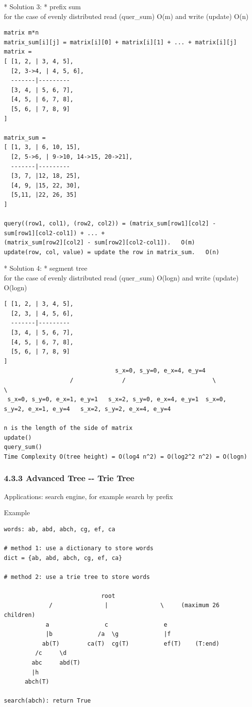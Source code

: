 \documentclass[11pt]{article}
\begin{document}
 * Solution 3: * prefix sum\\
for the case of evenly distributed read (quer\_sum) O(m) and write
(update) O(n)

\begin{verbatim}
matrix m*n
matrix_sum[i][j] = matrix[i][0] + matrix[i][1] + ... + matrix[i][j]
matrix = 
[ [1, 2, | 3, 4, 5],
  [2, 3->4, | 4, 5, 6],
  -------|---------
  [3, 4, | 5, 6, 7],
  [4, 5, | 6, 7, 8],
  [5, 6, | 7, 8, 9]
]

matrix_sum = 
[ [1, 3, | 6, 10, 15],
  [2, 5->6, | 9->10, 14->15, 20->21],
  -------|---------
  [3, 7, |12, 18, 25],
  [4, 9, |15, 22, 30],
  [5,11, |22, 26, 35]
]

query((row1, col1), (row2, col2)) = (matrix_sum[row1][col2] - sum[row1][col2-col1]) + ... +
(matrix_sum[row2][col2] - sum[row2][col2-col1]).   O(m)
update(row, col, value) = update the row in matrix_sum.   O(n)
\end{verbatim}

 * Solution 4: * segment tree\\
for the case of evenly distributed read (quer\_sum) O(logn) and write
(update) O(logn)

\begin{verbatim}
[ [1, 2, | 3, 4, 5],
  [2, 3, | 4, 5, 6],
  -------|---------
  [3, 4, | 5, 6, 7],
  [4, 5, | 6, 7, 8],
  [5, 6, | 7, 8, 9]
]
                                s_x=0, s_y=0, e_x=4, e_y=4
                   /              /                         \                          \
 s_x=0, s_y=0, e_x=1, e_y=1   s_x=2, s_y=0, e_x=4, e_y=1  s_x=0, s_y=2, e_x=1, e_y=4   s_x=2, s_y=2, e_x=4, e_y=4 
 
n is the length of the side of matrix
update()
query_sum()
Time Complexity O(tree height) = O(log4 n^2) = O(log2^2 n^2) = O(logn)
\end{verbatim}

    \subsubsection{4.3.3 Advanced Tree -\/- Trie
Tree}\label{advanced-tree----trie-tree}

Applications: search engine, for example search by prefix

Example

\begin{verbatim}
words: ab, abd, abch, cg, ef, ca

# method 1: use a dictionary to store words
dict = {ab, abd, abch, cg, ef, ca}

# method 2: use a trie tree to store words

                            root
             /               |               \     (maximum 26 children)
            a                c                e
            |b             /a  \g             |f  
           ab(T)        ca(T)  cg(T)          ef(T)    (T:end)
         /c     \d
        abc     abd(T)
        |h
      abch(T)

search(abch): return True
\end{verbatim}
\end{document}
